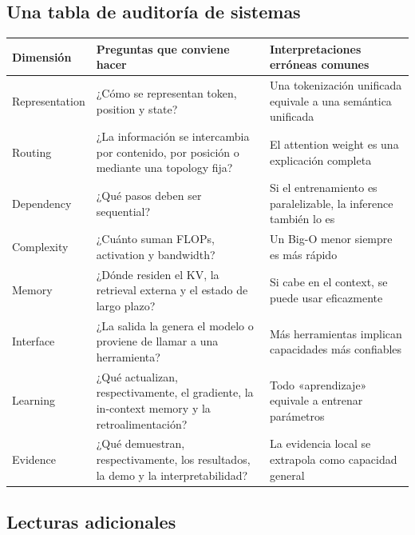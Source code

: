 \subsection{Una tabla de auditoría de sistemas}

\begin{longtable}{@{}L{0.18\textwidth}L{0.35\textwidth}L{0.35\textwidth}@{}}
\toprule
Dimensión & Preguntas que conviene hacer & Interpretaciones erróneas comunes \\
\midrule
Representation & ¿Cómo se representan token, position y state? & Una tokenización unificada equivale a una semántica unificada \\
Routing & ¿La información se intercambia por contenido, por posición o mediante una topology fija? & El attention weight es una explicación completa \\
Dependency & ¿Qué pasos deben ser sequential? & Si el entrenamiento es paralelizable, la inference también lo es \\
Complexity & ¿Cuánto suman FLOPs, activation y bandwidth? & Un Big-O menor siempre es más rápido \\
Memory & ¿Dónde residen el KV, la retrieval externa y el estado de largo plazo? & Si cabe en el context, se puede usar eficazmente \\
Interface & ¿La salida la genera el modelo o proviene de llamar a una herramienta? & Más herramientas implican capacidades más confiables \\
Learning & ¿Qué actualizan, respectivamente, el gradiente, la in-context memory y la retroalimentación? & Todo «aprendizaje» equivale a entrenar parámetros \\
Evidence & ¿Qué demuestran, respectivamente, los resultados, la demo y la interpretabilidad? & La evidencia local se extrapola como capacidad general \\
\bottomrule
\end{longtable}

\subsection{Lecturas adicionales}

